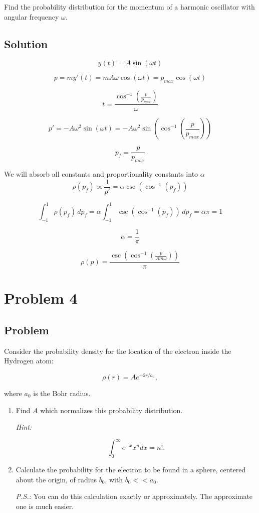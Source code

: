 \documentclass[12pt]{article}
\begin{document}
Find the probability distribution for the momentum of a harmonic oscillator with angular frequency $\omega $.

\subsection{Solution}

\[
    y(t) = A \sin (\omega t)
\]

\[
    p = m y'(t) = m A \omega \cos (\omega t) = p_{max} \cos (\omega t)
\]

\[
    t = \frac{\cos^{-1}(\frac{p}{p_{max}})}{\omega}
\]

\[
    p' = - A \omega^2 \sin (\omega t) = - A \omega^2 \sin (\cos^{-1}(\frac{p}{p_{max}}))
\]

\[
    p_f = \frac{p}{p_{max}}
\]

We will absorb all constants and proportionality constants into \(\alpha\)
\[
    \rho(p_f) \propto \frac{1}{p'} = \alpha \csc (\cos^{-1}(p_f))
\]

\[
    \int^1_{-1} \rho(p_f)\,dp_f = \alpha \int^1_{-1}\csc (\cos^{-1}(p_f))\,dp_f = \alpha \pi = 1
\]

\[
    \alpha = \frac{1}{\pi}
\]

\[
    \rho(p) = \frac{\csc (\cos^{-1}(\frac{p}{A m \omega}))}{\pi}
\]

\newpage

\section{Problem 4}

\subsection{Problem}

Consider the probability density for the location of the electron inside the Hydrogen atom:

\begin{equation}
    \rho(r)=A e^{-2 r / a_{0}},
\end{equation}

where $a_{0}$ is the Bohr radius.

\renewcommand{\labelenumi}{(\alph{enumi})}
\begin{enumerate}
    \item Find $A$ which normalizes this probability distribution.

          \textit{Hint:}

          \begin{equation}
              \int_{0}^{\infty} e^{-x} x^{n} d x=n!.
          \end{equation}
    \item Calculate the probability for the electron to be found in a sphere, centered about the origin, of radius $b_{0}$, with $b_{0}<<a_{0}$.

          \textit{P.S.:} You can do this calculation exactly or approximately. The approximate one is much easier.
\end{enumerate}
\end{document}
